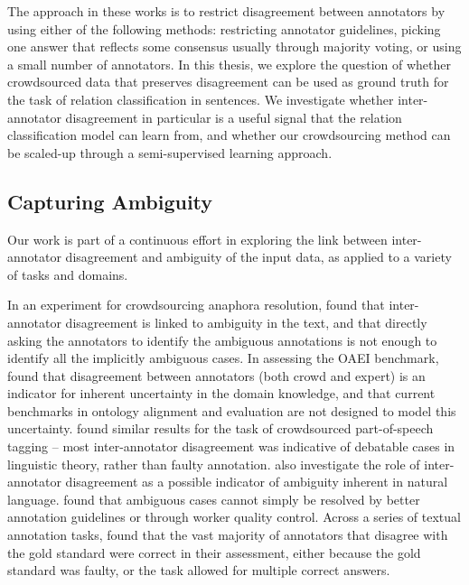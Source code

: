 The approach in these works is to restrict disagreement between annotators by using either of the following methods: restricting annotator guidelines, picking one answer that reflects some consensus usually through majority voting, or using a small number of annotators. In this thesis, we explore the question of whether crowdsourced data that preserves disagreement can be used as ground truth for the task of relation classification in sentences. We investigate whether inter-annotator disagreement in particular is a useful signal that the relation classification model can learn from, and whether our crowdsourcing method can be scaled-up through a semi-supervised learning approach.


\subsection{Capturing Ambiguity}
\label{sec:rel-work-ambig}

Our work is part of a continuous effort in exploring the link between inter-annotator disagreement and ambiguity of the input data, as applied to a variety of tasks and domains.

In an experiment for crowdsourcing anaphora resolution, \citet{poesio2005reliability} found that inter-annotator disagreement is linked to ambiguity in the text, and that directly asking the annotators to identify the ambiguous annotations is not enough to identify all the implicitly ambiguous cases. In assessing the OAEI benchmark, \citet{cheatham2014conference} found that disagreement between annotators (both crowd and expert) is an indicator for inherent uncertainty in the domain knowledge, and that current benchmarks in ontology alignment and evaluation are not designed to model this uncertainty. \citet{plank-hovy-sogaard:2014:P14-2} found similar results for the task of crowdsourced part-of-speech tagging -- most inter-annotator disagreement was indicative of debatable cases in linguistic theory, rather than faulty annotation. \citet{Bayerl2011} also investigate the role of inter-annotator disagreement as a possible indicator of ambiguity inherent in natural language. \citet{Chang:2017:Revolt} found that ambiguous cases cannot simply be resolved by better annotation guidelines or through worker quality control. Across a series of textual annotation tasks, \citet{chang2016linguistic} found that the vast majority of annotators that disagree with the gold standard were correct in their assessment, either because the gold standard was faulty, or the task allowed for multiple correct answers. %

